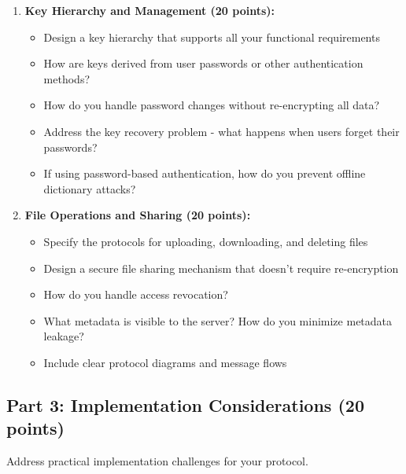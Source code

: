 \documentclass[10pt,a4paper,american]{exam}
\begin{document}
\begin{enumerate}
	\item \textbf{Key Hierarchy and Management (20 points):}
	      \begin{itemize}
		      \item Design a key hierarchy that supports all your functional requirements
		      \item How are keys derived from user passwords or other authentication methods?
		      \item How do you handle password changes without re-encrypting all data?
		      \item Address the key recovery problem - what happens when users forget their passwords?
		      \item If using password-based authentication, how do you prevent offline dictionary attacks?
	      \end{itemize}

	\item \textbf{File Operations and Sharing (20 points):}
	      \begin{itemize}
		      \item Specify the protocols for uploading, downloading, and deleting files
		      \item Design a secure file sharing mechanism that doesn't require re-encryption
		      \item How do you handle access revocation?
		      \item What metadata is visible to the server? How do you minimize metadata leakage?
		      \item Include clear protocol diagrams and message flows
	      \end{itemize}
\end{enumerate}

\subsection{Part 3: Implementation Considerations (20 points)}

Address practical implementation challenges for your protocol.
\end{document}
